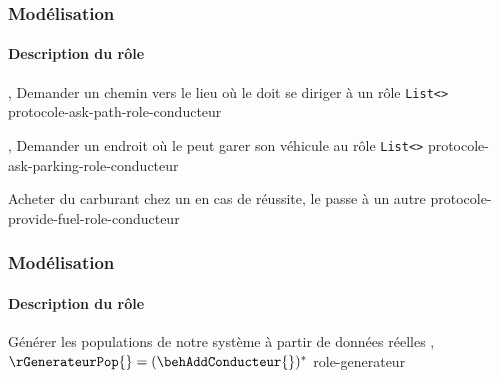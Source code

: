 \begin{frame}[shrink=40, fragile]
    \frametitle{Modélisation}
    \framesubtitle{Description du rôle \rConducteur{}}

    \begin{center}
        \protocoleTable{\behAskPath{}}
        {\rConducteur{}}
        {\rGps{}}
        {\varCurrentLocation{}, \varDestination{}}
        {Demander un chemin vers le lieu où le \rConducteur{} doit se diriger à un rôle \rGps{}}
        {\texttt{List<\varPaths{}>}}
        {\rConducteur{}}{protocole-ask-path-role-conducteur}

        \protocoleTable{\behAskParking{}}
        {\rConducteur{}}
        {\rGps{}}
        {\varCurrentLocation{}, \varVehiculeType{}}
        {Demander un endroit où le \rConducteur{} peut garer son véhicule au rôle \rGps{}}
        {\texttt{List<\varParkings{}>}}
        {\rConducteur{}}{protocole-ask-parking-role-conducteur}

        \protocoleTable{\behNegociateFuelPrice{}}
        {\rConducteur{}}
        {\rVCarburant{}}
        {\varFuelQuantity{}}
        {Acheter du carburant chez un \rVCarburant{}}
        {\varFuel{} en cas de réussite, le \rConducteur{} passe à un autre \rVCarburant{}}
        {\rConducteur{}}{protocole-provide-fuel-role-conducteur}

    \end{center}

\end{frame}


\begin{frame}[shrink=20]
    \frametitle{Modélisation}
    \framesubtitle{Description du rôle \rInitialisateur{}}


    \roleTable{\rGenerateurPop{}}
    {Générer les populations de notre système à partir de données réelles}
    {}
    {\behAddConducteur{}}
    {\permsMobilityData{}, \permsAddAgent{}}
    {$\rGenerateurPop{}=(\behAddConducteur{})^{*}$}
    {\safetyPopLimit{}}
    {role-generateur}

\end{frame}

